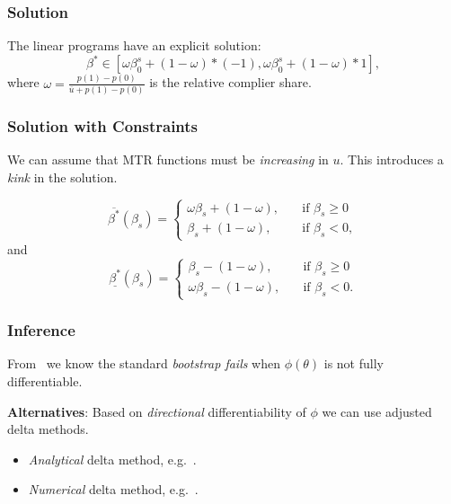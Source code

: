 \documentclass[11pt, aspectratio=169]{beamer}
\begin{document}
\begin{frame}
    \frametitle{Solution}
    The linear programs have an explicit solution:
    \begin{equation}
        \beta^* \in [\omega \beta_0^s + (1 - \omega) * (-1), \omega \beta_0^s + (1-\omega) * 1],
    \end{equation}
    where $\omega = \frac{p(1) - p(0)}{\overline{u} + p(1) - p(0)}$ is the relative complier share.
\end{frame}

\begin{frame}
    \frametitle{Solution with Constraints}

    We can assume that MTR functions must be \textit{increasing} in $u$.
    This introduces a \textit{kink} in the solution.

    \begin{equation}
        \overline{\beta^*}(\beta_s)=
        \begin{cases}
            \omega \beta_s + (1 - \omega),& \quad \text{if } \beta_s \geq 0\\
            \beta_s + (1 - \omega),              & \quad \text{if } \beta_s < 0,
        \end{cases}
    \end{equation}
    and
    \begin{equation}
        \underline{\beta^*}(\beta_s)=
        \begin{cases}
            \beta_s - (1 - \omega),& \quad \text{if } \beta_s \geq 0\\
            \omega \beta_s - (1 - \omega),              & \quad \text{if } \beta_s < 0.
        \end{cases}
    \end{equation}

\end{frame}

\begin{frame}
    \frametitle{Inference}

    From~\cite{fang2019inference} we know the standard \textit{bootstrap fails} when $\phi(\theta)$ is not fully differentiable.

    \vspace{0.5cm}

    \textbf{Alternatives}: Based on \textit{directional} differentiability of $\phi$ we can use adjusted delta methods.
    \begin{itemize}
        \item \textit{Analytical} delta method, e.g.~\cite{fang2019inference}.
        \item \textit{Numerical} delta method, e.g.~\cite{hong2018numerical}.
    \end{itemize}


\end{frame}
\end{document}
